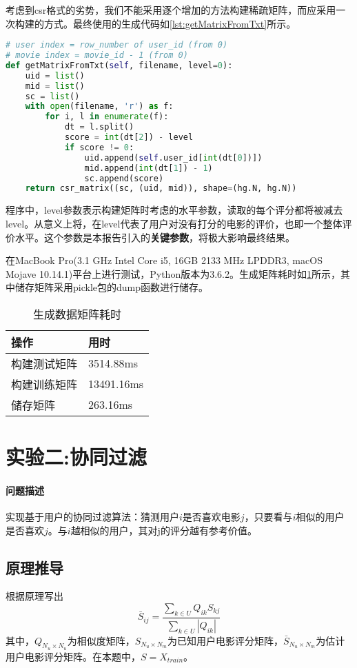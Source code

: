 \documentclass[a4paper,12pt]{article}
\begin{document}
    考虑到csr格式的劣势，我们不能采用逐个增加的方法构建稀疏矩阵，而应采用一次构建的方式。最终使用的生成代码如\cref{lst:getMatrixFromTxt}所示。
    \begin{lstlisting}[language=python,caption={getMatrixFromTxt},label=lst:getMatrixFromTxt]
# user index = row_number of user_id (from 0)
# movie index = movie_id - 1 (from 0)
def getMatrixFromTxt(self, filename, level=0):
    uid = list()
    mid = list()
    sc = list()
    with open(filename, 'r') as f:
        for i, l in enumerate(f):
            dt = l.split()
            score = int(dt[2]) - level
            if score != 0:
                uid.append(self.user_id[int(dt[0])])
                mid.append(int(dt[1]) - 1)
                sc.append(score)
    return csr_matrix((sc, (uid, mid)), shape=(hg.N, hg.N))
    \end{lstlisting}

    程序中，level参数表示构建矩阵时考虑的水平参数，读取的每个评分都将被减去level。从意义上将，在level代表了用户对没有打分的电影的评价，也即一个整体评价水平。这个参数是本报告引入的\textbf{关键参数}，将极大影响最终结果。

    在MacBook Pro(3.1 GHz Intel Core i5, 16GB 2133 MHz LPDDR3, macOS Mojave 10.14.1)平台上进行测试，Python版本为3.6.2。生成矩阵耗时如\cref{tbl:exp1}所示，其中储存矩阵采用pickle包的dump函数进行储存。
    \begin{table}
      \centering
      \caption{生成数据矩阵耗时}
      \label{tbl:exp1}
      \begin{tabular}{ll}
        \toprule
        操作&用时\\
        \midrule
        构建测试矩阵&3514.88ms\\
        构建训练矩阵&13491.16ms\\
        储存矩阵&263.16ms\\
        \bottomrule
      \end{tabular}
    \end{table}
    \section{实验二:协同过滤}
    \paragraph{问题描述}
    实现基于用户的协同过滤算法：猜测用户$i$是否喜欢电影$j$，只要看与$i$相似的用户是否喜欢$j$。与$i$越相似的用户，其对j的评分越有参考价值。
    \subsection{原理推导}
    根据原理写出
    $$
      \bar S_{ij} = \frac{\sum_{k\in U} Q_{ik}S_{kj}}{\sum_{k\in U} |Q_{ik}|}
    $$
    其中，$Q_{N_u\times N_u}$为相似度矩阵，$S_{N_u\times N_m}$为已知用户电影评分矩阵，$\bar S_{N_u\times N_m}$为估计用户电影评分矩阵。在本题中，$S=X_{train}$。
\end{document}
